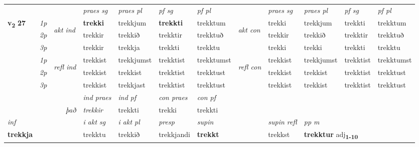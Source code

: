 \begin{longtable}[l]{X>{\footnotesize\itshape}llXXXXlXXXX}
\midrule

 & &   & \textit{praes sg}  & \textit{praes pl}    & \textit{ pf sg} & \textit{pf pl} & & \textit{praes sg}  & \textit{praes pl}    & \textit{pf sg} & \textit{pf pl }  \\ \cmidrule{4-7} \cmidrule{9-12}
 \multirow{2}{*}{{{\textbf{v{\textsubscript{2}}} \Large{\textbf{27}}}}}  & 1p & \multirow{3}{*}{\begin{turn}{90}\textit{akt ind}\end{turn}} & \textbf{trekki} & trekkjum & \textbf{trekkti} & trekktum & \multirow{3}{*}{\begin{turn}{90}\textit{akt con}\end{turn}} &trekki & trekkjum & trekkti & trekktum\\*
 & 2p &  &  trekkir  & trekkið & trekktir & trekktuð & & trekkir & trekkið & trekktir & trekktuð \\*
 & 3p &  & trekkir & trekkja & trekkti & trekktu & & trekki & trekki& trekkti & trekktu \\*
\cmidrule{4-7} \cmidrule{9-12}
 & 1p & \multirow{3}{*}{\begin{turn}{90}\textit{refl ind}\end{turn}}  & trekkist & trekkjumst & trekktist & trekktumst & \multirow{3}{*}{\begin{turn}{90}\textit{refl con}\end{turn}}  &trekkist & trekkjumst & trekktist & trekktumst \\*
 & 2p &  & trekkist & trekkist & trekktist & trekktust & &trekkist & trekkist & trekktist & trekktust \\*
 & 3p  & & trekkist & trekkjast & trekktist & trekktust & & trekkist & trekkist& trekktist & trekktust \\*
\cmidrule{4-7} \cmidrule{9-12}

   && &  \textit{ind praes} & \textit{ind pf} & \textit{con praes} & \textit{con pf} \\*
\multicolumn{3}{r}{\textit{það}} & trekkir & trekkti & trekki & trekkti \\*

\cmidrule{4-7}
   {\textit{inf}} & &  & \textit{i akt sg} & \textit{i akt pl}   & \textit{presp} & \textit{supin} && \textit{supin refl} & \textit{pp m} \\*
  {\textbf{trekkja}} & && trekktu  & trekkið   & trekkjandi &  \textbf{trekkt} && trekkst & \multicolumn{2}{l}{\textbf{trekktur} adj\textbf{\textsubscript{1-10}}} \\*


\end{longtable}

